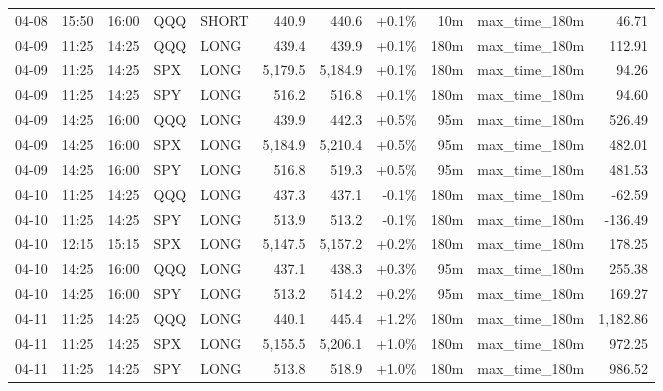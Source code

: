 \documentclass[11pt,a4paper,twoside]{article}
\begin{document}
\begin{center}
\begin{longtable}{>{\color{txtmain}}l l l l l r r r r >{\color{txtmain}}l r}
04-08 & 15:50 & 16:00 & QQQ & SHORT & 440.9 & 440.6 & \textcolor{wingreen}{+0.1\%} & 10m & max\_time\_180m & \textcolor{wingreen}{46.71} \\
04-09 & 11:25 & 14:25 & QQQ & LONG & 439.4 & 439.9 & \textcolor{wingreen}{+0.1\%} & 180m & max\_time\_180m & \textcolor{wingreen}{112.91} \\
04-09 & 11:25 & 14:25 & SPX & LONG & 5,179.5 & 5,184.9 & \textcolor{wingreen}{+0.1\%} & 180m & max\_time\_180m & \textcolor{wingreen}{94.26} \\
04-09 & 11:25 & 14:25 & SPY & LONG & 516.2 & 516.8 & \textcolor{wingreen}{+0.1\%} & 180m & max\_time\_180m & \textcolor{wingreen}{94.60} \\
04-09 & 14:25 & 16:00 & QQQ & LONG & 439.9 & 442.3 & \textcolor{wingreen}{+0.5\%} & 95m & max\_time\_180m & \textcolor{wingreen}{526.49} \\
04-09 & 14:25 & 16:00 & SPX & LONG & 5,184.9 & 5,210.4 & \textcolor{wingreen}{+0.5\%} & 95m & max\_time\_180m & \textcolor{wingreen}{482.01} \\
04-09 & 14:25 & 16:00 & SPY & LONG & 516.8 & 519.3 & \textcolor{wingreen}{+0.5\%} & 95m & max\_time\_180m & \textcolor{wingreen}{481.53} \\
04-10 & 11:25 & 14:25 & QQQ & LONG & 437.3 & 437.1 & \textcolor{lossred}{-0.1\%} & 180m & max\_time\_180m & \textcolor{lossred}{-62.59} \\
04-10 & 11:25 & 14:25 & SPY & LONG & 513.9 & 513.2 & \textcolor{lossred}{-0.1\%} & 180m & max\_time\_180m & \textcolor{lossred}{-136.49} \\
04-10 & 12:15 & 15:15 & SPX & LONG & 5,147.5 & 5,157.2 & \textcolor{wingreen}{+0.2\%} & 180m & max\_time\_180m & \textcolor{wingreen}{178.25} \\
04-10 & 14:25 & 16:00 & QQQ & LONG & 437.1 & 438.3 & \textcolor{wingreen}{+0.3\%} & 95m & max\_time\_180m & \textcolor{wingreen}{255.38} \\
04-10 & 14:25 & 16:00 & SPY & LONG & 513.2 & 514.2 & \textcolor{wingreen}{+0.2\%} & 95m & max\_time\_180m & \textcolor{wingreen}{169.27} \\
04-11 & 11:25 & 14:25 & QQQ & LONG & 440.1 & 445.4 & \textcolor{wingreen}{+1.2\%} & 180m & max\_time\_180m & \textcolor{wingreen}{1,182.86} \\
04-11 & 11:25 & 14:25 & SPX & LONG & 5,155.5 & 5,206.1 & \textcolor{wingreen}{+1.0\%} & 180m & max\_time\_180m & \textcolor{wingreen}{972.25} \\
04-11 & 11:25 & 14:25 & SPY & LONG & 513.8 & 518.9 & \textcolor{wingreen}{+1.0\%} & 180m & max\_time\_180m & \textcolor{wingreen}{986.52} \\

\end{longtable}
\end{center}
\end{document}
